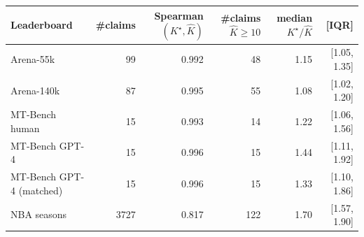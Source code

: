 \begin{tabular}{lrrrrr}
\toprule
 Leaderboard & \#claims & Spearman$(K^\star,\hat K)$ & \#claims $\hat K\!\ge\!10$ & median $K^\star/\hat K$ & [IQR] \\
\midrule
Arena-55k & 99 & 0.992 & 48 & 1.15 & [1.05, 1.35] \\
Arena-140k & 87 & 0.995 & 55 & 1.08 & [1.02, 1.20] \\
MT-Bench human & 15 & 0.993 & 14 & 1.22 & [1.06, 1.56] \\
MT-Bench GPT-4 & 15 & 0.996 & 15 & 1.44 & [1.11, 1.92] \\
MT-Bench GPT-4 (matched) & 15 & 0.996 & 15 & 1.33 & [1.10, 1.86] \\
NBA seasons & 3727 & 0.817 & 122 & 1.70 & [1.57, 1.90] \\
\bottomrule
\end{tabular}
